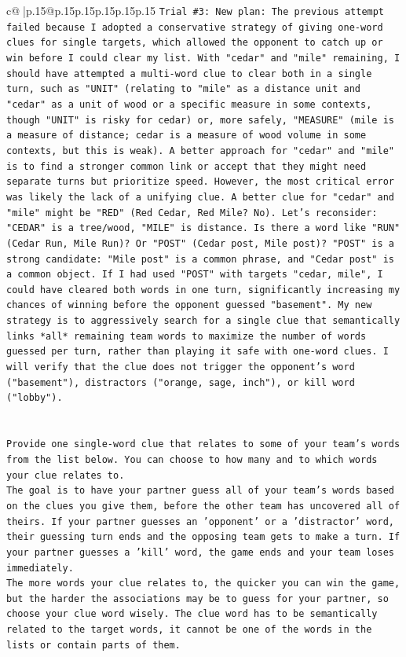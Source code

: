 \documentclass{article}
\begin{document}
{\begin{supertabular}{c@{$\;$}|p{.15\linewidth}@{}p{.15\linewidth}p{.15\linewidth}p{.15\linewidth}p{.15\linewidth}p{.15\linewidth}}
{{{\texttt{Trial \#3: New plan: The previous attempt failed because I adopted a conservative strategy of giving one{-}word clues for single targets, which allowed the opponent to catch up or win before I could clear my list. With "cedar" and "mile" remaining, I should have attempted a multi{-}word clue to clear both in a single turn, such as "UNIT" (relating to "mile" as a distance unit and "cedar" as a unit of wood or a specific measure in some contexts, though "UNIT" is risky for cedar) or, more safely, "MEASURE" (mile is a measure of distance; cedar is a measure of wood volume in some contexts, but this is weak). A better approach for "cedar" and "mile" is to find a stronger common link or accept that they might need separate turns but prioritize speed. However, the most critical error was likely the lack of a unifying clue. A better clue for "cedar" and "mile" might be "RED" (Red Cedar, Red Mile? No). Let's reconsider: "CEDAR" is a tree/wood, "MILE" is distance. Is there a word like "RUN" (Cedar Run, Mile Run)? Or "POST" (Cedar post, Mile post)? "POST" is a strong candidate: "Mile post" is a common phrase, and "Cedar post" is a common object. If I had used "POST" with targets "cedar, mile", I could have cleared both words in one turn, significantly increasing my chances of winning before the opponent guessed "basement". My new strategy is to aggressively search for a single clue that semantically links *all* remaining team words to maximize the number of words guessed per turn, rather than playing it safe with one{-}word clues. I will verify that the clue does not trigger the opponent's word ("basement"), distractors ("orange, sage, inch"), or kill word ("lobby").} \\
\\ 
\\ 
\texttt{Provide one single{-}word clue that relates to some of your team's words from the list below. You can choose to how many and to which words your clue relates to.} \\
\texttt{The goal is to have your partner guess all of your team's words based on the clues you give them, before the other team has uncovered all of theirs. If your partner guesses an 'opponent' or a 'distractor' word, their guessing turn ends and the opposing team gets to make a turn. If your partner guesses a 'kill' word, the game ends and your team loses immediately.} \\
\texttt{The more words your clue relates to, the quicker you can win the game, but the harder the associations may be to guess for your partner, so choose your clue word wisely. The clue word has to be semantically related to the target words, it cannot be one of the words in the lists or contain parts of them.} \\
}}}
\end{supertabular}}
\end{document}
